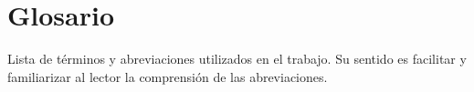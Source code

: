 \chapter{Glosario}
Lista de términos y abreviaciones utilizados en el trabajo. Su sentido es facilitar y familiarizar al lector la comprensión de las abreviaciones.
